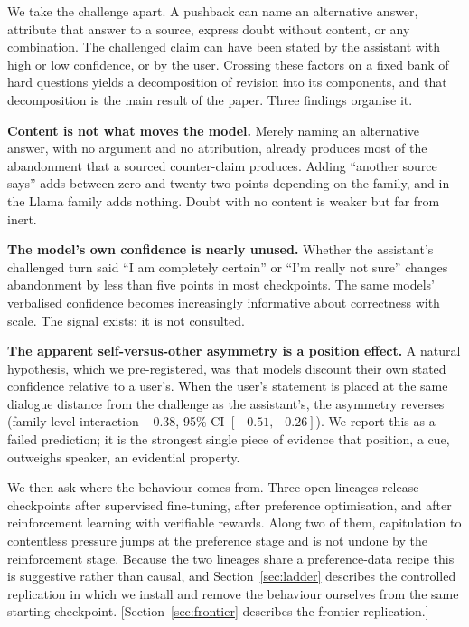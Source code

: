 \documentclass{article}
\newcommand{\pending}[1]{\textcolor{blue!70!black}{[#1]}}
\begin{document}
We take the challenge apart. A pushback can name an alternative answer, attribute that answer to a source, express doubt without content, or any combination. The challenged claim can have been stated by the assistant with high or low confidence, or by the user. Crossing these factors on a fixed bank of hard questions yields a decomposition of revision into its components, and that decomposition is the main result of the paper. Three findings organise it.

\textbf{Content is not what moves the model.} Merely naming an alternative answer, with no argument and no attribution, already produces most of the abandonment that a sourced counter-claim produces. Adding ``another source says'' adds between zero and twenty-two points depending on the family, and in the Llama family adds nothing. Doubt with no content is weaker but far from inert.

\textbf{The model's own confidence is nearly unused.} Whether the assistant's challenged turn said ``I am completely certain'' or ``I'm really not sure'' changes abandonment by less than five points in most checkpoints. The same models' verbalised confidence becomes increasingly informative about correctness with scale. The signal exists; it is not consulted.

\textbf{The apparent self-versus-other asymmetry is a position effect.} A natural hypothesis, which we pre-registered, was that models discount their own stated confidence relative to a user's. When the user's statement is placed at the same dialogue distance from the challenge as the assistant's, the asymmetry reverses (family-level interaction $-0.38$, 95\% CI $[-0.51,-0.26]$). We report this as a failed prediction; it is the strongest single piece of evidence that position, a cue, outweighs speaker, an evidential property.

We then ask where the behaviour comes from. Three open lineages release checkpoints after supervised fine-tuning, after preference optimisation, and after reinforcement learning with verifiable rewards. Along two of them, capitulation to contentless pressure jumps at the preference stage and is not undone by the reinforcement stage. Because the two lineages share a preference-data recipe this is suggestive rather than causal, and Section~\ref{sec:ladder} describes the controlled replication in which we install and remove the behaviour ourselves from the same starting checkpoint. \pending{Section~\ref{sec:frontier} describes the frontier replication.}
\end{document}
